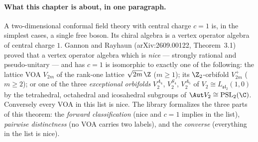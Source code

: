 \paragraph{What this chapter is about, in one paragraph.} A two-dimensional conformal field theory
with central charge $c=1$ is, in the simplest cases, a single free boson. Its chiral algebra is a vertex
operator algebra of central charge $1$. Gannon and Rayhaun (arXiv:2609.00122, Theorem~3.1) proved that a
vertex operator algebra which is \emph{nice} --- strongly rational and pseudo-unitary --- and has $c=1$ is
isomorphic to exactly one of the following: the lattice VOA $V_{2m}$ of the rank-one lattice $\sqrt{2m}\,\Z$
($m\ge1$); its $\Z_2$-orbifold $V_{2m}^+$ ($m\ge2$); or one of the three \emph{exceptional orbifolds}
$V_2^{A_4}$, $V_2^{S_4}$, $V_2^{A_5}$ of $V_2 \cong L_{\mathfrak{sl}_2}(1,0)$ by the tetrahedral, octahedral and
icosahedral subgroups of $\Aut V_2\cong \mathrm{PSL}_2(\C)$. Conversely every VOA in this list is nice.
The library formalizes the three parts of this theorem: the \emph{forward classification} (nice and
$c=1$ implies in the list), \emph{pairwise distinctness} (no VOA carries two labels), and the
\emph{converse} (everything in the list is nice).

